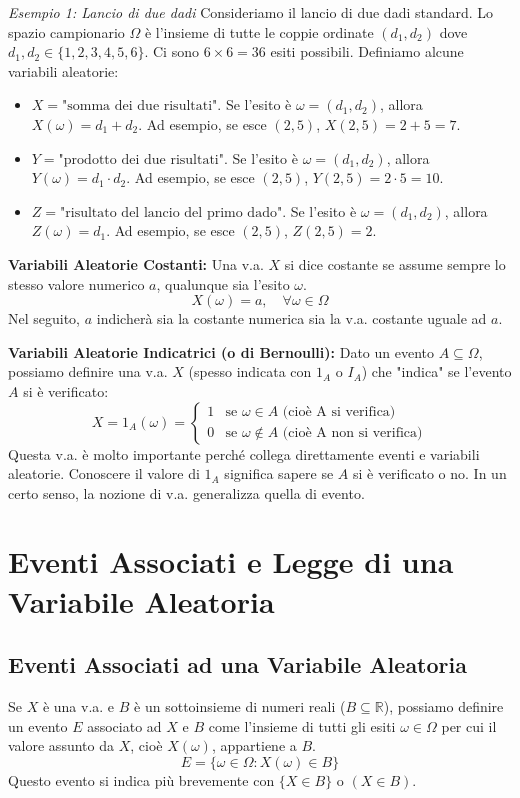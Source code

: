 \textit{Esempio 1: Lancio di due dadi}
Consideriamo il lancio di due dadi standard. Lo spazio campionario $\Omega$ è l'insieme di tutte le coppie ordinate $(d_1, d_2)$ dove $d_1, d_2 \in \{1, 2, 3, 4, 5, 6\}$. Ci sono $6 \times 6 = 36$ esiti possibili.
Definiamo alcune variabili aleatorie:
\begin{itemize}
    \item $X = \text{"somma dei due risultati"}$.
    Se l'esito è $\omega = (d_1, d_2)$, allora $X(\omega) = d_1 + d_2$.
    Ad esempio, se esce $(2, 5)$, $X(2,5) = 2+5=7$.
    \item $Y = \text{"prodotto dei due risultati"}$.
    Se l'esito è $\omega = (d_1, d_2)$, allora $Y(\omega) = d_1 \cdot d_2$.
    Ad esempio, se esce $(2, 5)$, $Y(2,5) = 2 \cdot 5=10$.
    \item $Z = \text{"risultato del lancio del primo dado"}$.
    Se l'esito è $\omega = (d_1, d_2)$, allora $Z(\omega) = d_1$.
    Ad esempio, se esce $(2, 5)$, $Z(2,5) = 2$.
\end{itemize}

\textbf{Variabili Aleatorie Costanti:}
Una v.a. $X$ si dice costante se assume sempre lo stesso valore numerico $a$, qualunque sia l'esito $\omega$.
\[ X(\omega) = a, \quad \forall \omega \in \Omega \]
Nel seguito, $a$ indicherà sia la costante numerica sia la v.a. costante uguale ad $a$.

\textbf{Variabili Aleatorie Indicatrici (o di Bernoulli):}
Dato un evento $A \subseteq \Omega$, possiamo definire una v.a. $X$ (spesso indicata con $1_A$ o $I_A$) che "indica" se l'evento $A$ si è verificato:
\[ X = 1_A(\omega) = \begin{cases} 1 & \text{se } \omega \in A \text{ (cioè A si verifica)} \\ 0 & \text{se } \omega \notin A \text{ (cioè A non si verifica)} \end{cases} \]
Questa v.a. è molto importante perché collega direttamente eventi e variabili aleatorie. Conoscere il valore di $1_A$ significa sapere se $A$ si è verificato o no. In un certo senso, la nozione di v.a. generalizza quella di evento.

\section{Eventi Associati e Legge di una Variabile Aleatoria}

\subsection{Eventi Associati ad una Variabile Aleatoria}
Se $X$ è una v.a. e $B$ è un sottoinsieme di numeri reali ($B \subseteq \mathbb{R}$), possiamo definire un evento $E$ associato ad $X$ e $B$ come l'insieme di tutti gli esiti $\omega \in \Omega$ per cui il valore assunto da $X$, cioè $X(\omega)$, appartiene a $B$.
\[ E = \{\omega \in \Omega : X(\omega) \in B\} \]
Questo evento si indica più brevemente con $\{X \in B\}$ o $(X \in B)$.

